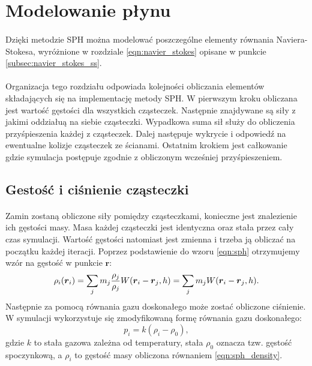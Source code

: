 \newpage

\section{Modelowanie płynu}

\paragraph{}
Dzięki metodzie SPH można modelować poszczególne elementy równania Naviera-Stokesa, wyróżnione w rozdziale \eqref{eqn:navier_stokes} opisane w punkcie \eqref{subsec:navier_stokes_ss}.
\par
\paragraph{}
\indent Organizacja tego rozdziału odpowiada kolejności obliczania elementów składających się na implementację metody SPH. W pierwszym kroku obliczana jest wartość gęstości dla wszystkich cząsteczek. Następnie znajdywane są siły z jakimi oddziałuą na siebie cząsteczki. Wypadkowa suma sił służy do obliczenia przyśpieszenia każdej z cząsteczek. Dalej następuje wykrycie i odpowiedź na ewentualne kolizje cząsteczek ze ścianami. Ostatnim krokiem jest całkowanie gdzie symulacja postępuje zgodnie z obliczonym wcześniej przyśpieszeniem.
\par

\subsection{Gestość i ciśnienie cząsteczki}

\paragraph{}
Zamin zostaną obliczone siły pomiędzy cząsteczkami, konieczne jest znalezienie ich gęstości masy. Masa każdej cząsteczki jest identyczna oraz stała przez cały czas symulacji. Wartość gęstości natomiast jest zmienna i trzeba ją obliczać na początku każdej iteracji. Poprzez podstawienie do wzoru \eqref{eqn:sph} otrzymujemy wzór na gęstość w punkcie $\boldsymbol{r}$:
\begin{equation}
\rho_i(\boldsymbol{r}_i) = \sum\limits_{j} m_j {\rho_j \over\rho_j}W(\boldsymbol{r}_i-\boldsymbol{r}_j, h) = \sum\limits_{j} m_j W(\boldsymbol{r}_i-\boldsymbol{r}_j, h).
\label{eqn:sph_density}
\end{equation}
Następnie za pomocą równania gazu doskonałego może zostać obliczone ciśnienie. W symulacji wykorzystuje się zmodyfikowaną formę równania gazu doskonałego:
\begin{equation}
p_i = k(\rho_i - \rho_0),
\label{eqn:sph_desbrun_pressure}
\end{equation}
gdzie $k$ to stała gazowa zależna od temperatury, stała $\rho_0$ oznacza tzw. gęstość spoczynkową, a $\rho_i$ to gęstość masy obliczona równaniem \eqref{eqn:sph_density}.
\par

